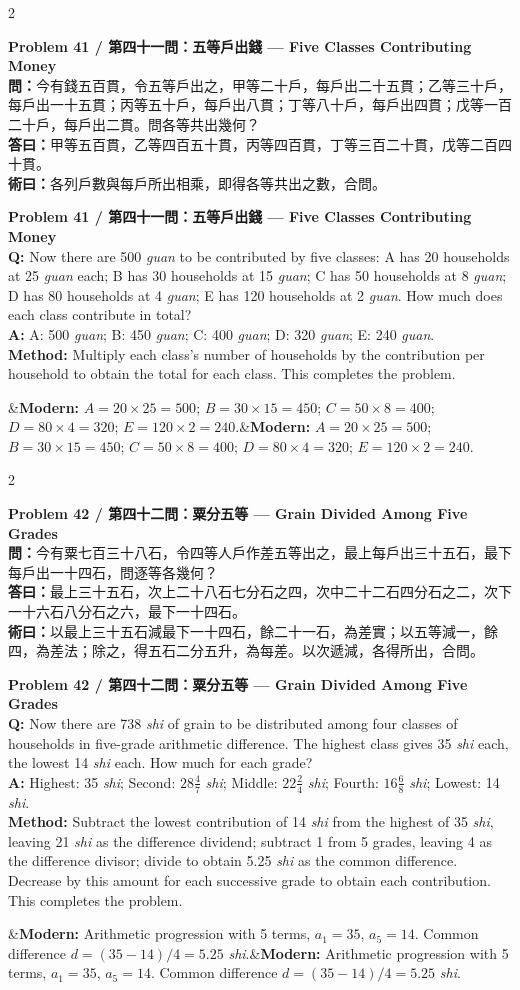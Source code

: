 \documentclass[11pt,a4paper]{article}
\newcommand{\bilingualproblem}[4]{%
  \begin{paracol}{2}
  \begin{leftcolumn}
  \noindent\textbf{\color{problemcolor}#1}\\[0.2cm]
  #2
  \end{leftcolumn}
  \switchcolumn
  \noindent\textbf{\color{problemcolor}#1}\\[0.2cm]
  #3
  \end{paracol}
  \ifx&#4&\else\vspace{0.3cm}\noindent#4\fi
  \vspace{0.5cm}
}
\newcommand{\wen}[1]{\textcolor{problemcolor}{\textbf{問：}}#1}
\newcommand{\da}[1]{\textcolor{answercolor}{\textbf{答曰：}}#1}
\newcommand{\shu}[1]{\textcolor{methodcolor}{\textbf{術曰：}}#1}
\newcommand{\wenen}[1]{\textcolor{problemcolor}{\textbf{Q:}} #1}
\newcommand{\daen}[1]{\textcolor{answercolor}{\textbf{A:}} #1}
\newcommand{\shuen}[1]{\textcolor{methodcolor}{\textbf{Method:}} #1}
\begin{document}
\vspace{0.5cm}

\bilingualproblem{Problem 41 / 第四十一問：五等戶出錢 --- Five Classes Contributing Money}{
\wen{今有錢五百貫，令五等戶出之，甲等二十戶，每戶出二十五貫；乙等三十戶，每戶出一十五貫；丙等五十戶，每戶出八貫；丁等八十戶，每戶出四貫；戊等一百二十戶，每戶出二貫。問各等共出幾何？}\\[0.2cm]
\da{甲等五百貫，乙等四百五十貫，丙等四百貫，丁等三百二十貫，戊等二百四十貫。}\\[0.2cm]
\shu{各列戶數與每戶所出相乘，即得各等共出之數，合問。}
}{
\wenen{Now there are 500 \textit{guan} to be contributed by five classes: A has 20 households at 25 \textit{guan} each; B has 30 households at 15 \textit{guan}; C has 50 households at 8 \textit{guan}; D has 80 households at 4 \textit{guan}; E has 120 households at 2 \textit{guan}. How much does each class contribute in total?}\\[0.2cm]
\daen{A: 500 \textit{guan}; B: 450 \textit{guan}; C: 400 \textit{guan}; D: 320 \textit{guan}; E: 240 \textit{guan}.}\\[0.2cm]
\shuen{Multiply each class's number of households by the contribution per household to obtain the total for each class. This completes the problem.}
}{\textbf{Modern:} $A = 20 \times 25 = 500$; $B = 30 \times 15 = 450$; $C = 50 \times 8 = 400$; $D = 80 \times 4 = 320$; $E = 120 \times 2 = 240$.}

\bilingualproblem{Problem 42 / 第四十二問：粟分五等 --- Grain Divided Among Five Grades}{
\wen{今有粟七百三十八石，令四等人戶作差五等出之，最上每戶出三十五石，最下每戶出一十四石，問逐等各幾何？}\\[0.2cm]
\da{最上三十五石，次上二十八石七分石之四，次中二十二石四分石之二，次下一十六石八分石之六，最下一十四石。}\\[0.2cm]
\shu{以最上三十五石減最下一十四石，餘二十一石，為差實；以五等減一，餘四，為差法；除之，得五石二分五升，為每差。以次遞減，各得所出，合問。}
}{
\wenen{Now there are 738 \textit{shi} of grain to be distributed among four classes of households in five-grade arithmetic difference. The highest class gives 35 \textit{shi} each, the lowest 14 \textit{shi} each. How much for each grade?}\\[0.2cm]
\daen{Highest: 35 \textit{shi}; Second: $28\frac{4}{7}$ \textit{shi}; Middle: $22\frac{2}{4}$ \textit{shi}; Fourth: $16\frac{6}{8}$ \textit{shi}; Lowest: 14 \textit{shi}.}\\[0.2cm]
\shuen{Subtract the lowest contribution of 14 \textit{shi} from the highest of 35 \textit{shi}, leaving 21 \textit{shi} as the difference dividend; subtract 1 from 5 grades, leaving 4 as the difference divisor; divide to obtain 5.25 \textit{shi} as the common difference. Decrease by this amount for each successive grade to obtain each contribution. This completes the problem.}
}{\textbf{Modern:} Arithmetic progression with 5 terms, $a_1 = 35$, $a_5 = 14$. Common difference $d = (35-14)/4 = 5.25$ \textit{shi}.}
\end{document}
